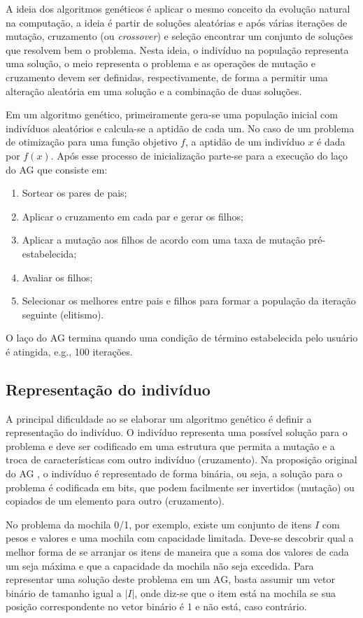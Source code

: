 A ideia dos algoritmos genéticos é aplicar o mesmo conceito da evolução natural na computação, a ideia é partir de soluções aleatórias e após várias iterações de mutação, cruzamento (ou \textit{crossover}) e seleção encontrar um conjunto de soluções que resolvem bem o problema. Nesta ideia, o indivíduo na população representa uma solução, o meio representa o problema e as operações de mutação e cruzamento devem ser definidas, respectivamente, de forma a permitir uma alteração aleatória em uma solução e a combinação de duas soluções.

Em um algoritmo genético, primeiramente gera-se uma população inicial com indivíduos aleatórios e calcula-se a aptidão de cada um. No caso de um problema de otimização para uma função objetivo $f$, a aptidão de um indivíduo $x$ é dada por $f(x)$. Após esse processo de inicialização parte-se para a execução do laço do AG que consiste em:

\begin{enumerate}  
	\item Sortear os pares de pais; 
	\item Aplicar o cruzamento em cada par e gerar os filhos; 
	\item Aplicar a mutação aos filhos de acordo com uma taxa de mutação pré-estabelecida;
	\item Avaliar os filhos;
	\item Selecionar os melhores entre pais e filhos para formar a população da iteração seguinte (elitismo).
\end{enumerate}

O laço do AG termina quando uma condição de término estabelecida pelo usuário é atingida, e.g., 100 iterações.

\subsection{Representação do indivíduo}
A principal dificuldade ao se elaborar um algoritmo genético é definir a representação do indivíduo. O indivíduo representa uma possível solução para o problema e deve ser codificado em uma estrutura que permita a mutação e a troca de características com outro indivíduo (cruzamento). Na proposição original do AG \cite{Goldberg1989}, o indivíduo é representado de forma binária, ou seja, a solução para o problema é codificada em bits, que podem facilmente ser invertidos (mutação) ou copiados de um elemento para outro (cruzamento).

No problema da mochila 0/1, por exemplo, existe um conjunto de itens $I$ com pesos e valores e uma mochila com capacidade limitada. Deve-se descobrir qual a melhor forma de se arranjar os itens de maneira que a soma dos valores de cada um seja máxima e que a capacidade da mochila não seja excedida. Para representar uma solução deste problema em um AG, basta assumir um vetor binário de tamanho igual a $|I|$, onde diz-se que o item está na mochila se sua posição correspondente no vetor binário é 1 e não está, caso contrário.

